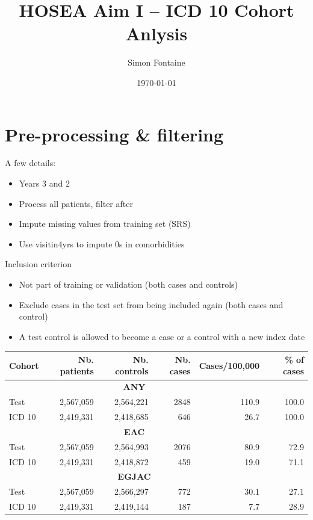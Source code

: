 \documentclass[english]{article}
\title{HOSEA Aim I -- ICD 10 Cohort Anlysis}
\author{Simon Fontaine}
\date{\today}
\begin{document}
\maketitle
\tableofcontents

\newpage
\clearpage
\section{Pre-processing \& filtering}

A few details:
\begin{itemize}
	\item Years 3 and 2
	\item Process all patients, filter after
	\item Impute missing values from training set (SRS)
	\item Use visitin4yrs to impute 0s in comorbidities
\end{itemize}
Inclusion criterion
\begin{itemize}
	\item Not part of training or validation (both cases and controls)
	\item Exclude cases in the test set from being included again (both cases and control)
	\item A test control is allowed to become a case or a control with a new index date
\end{itemize}


\begin{table}[h]
\centering
\begin{tabular}{lrrrrr}
\toprule
\textbf{Cohort} & Nb. patients & Nb. controls & Nb. cases & Cases/100,000 & \% of cases\\
\midrule
\multicolumn{5}{c}{\textbf{ANY}}\\\addlinespace
Test 	&	2,567,059	&	2,564,221	&	2848		&	110.9	&	100.0\\
ICD 10 	&	2,419,331	&	2,418,685	&	646		&	26.7		&	100.0\\
\midrule
\multicolumn{5}{c}{\textbf{EAC}}\\\addlinespace
Test 	&	2,567,059	&	2,564,993	&	2076		&	80.9		& 	72.9\\
ICD 10 	&	2,419,331	&	2,418,872	&	459		&	19.0		& 	71.1\\
\midrule
\multicolumn{5}{c}{\textbf{EGJAC}}\\\addlinespace
Test 	&	2,567,059	&	2,566,297	&	772		&	30.1		&	27.1\\
ICD 10 	&	2,419,331	&	2,419,144	&	187		&	7.7		&	28.9\\
\bottomrule
\end{tabular}
\end{table}
\end{document}
